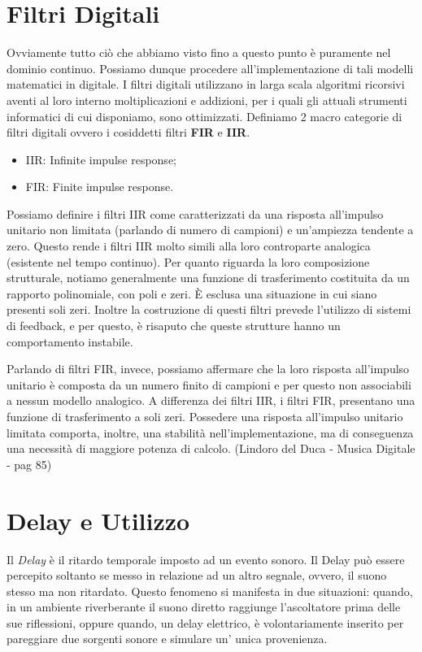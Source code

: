\section{Filtri Digitali}

Ovviamente tutto ciò che abbiamo visto fino a questo punto è puramente nel dominio continuo. Possiamo dunque procedere all’implementazione di tali modelli matematici in digitale. I filtri digitali utilizzano in larga scala algoritmi ricorsivi aventi al loro interno moltiplicazioni e addizioni, per i quali gli attuali strumenti informatici di cui disponiamo, sono ottimizzati. Definiamo 2 macro categorie di filtri digitali ovvero i cosiddetti filtri \textbf{FIR} e \textbf{IIR}.
\begin{itemize}
\item IIR: Infinite impulse response;
\item FIR: Finite impulse response.
\end{itemize}
Possiamo definire i filtri IIR come caratterizzati da una risposta all’impulso unitario non limitata (parlando di numero di campioni) e un’ampiezza tendente a zero.
Questo rende i filtri IIR molto simili alla loro controparte analogica (esistente nel tempo continuo).
Per quanto riguarda la loro composizione strutturale, notiamo generalmente una funzione di trasferimento costituita da un rapporto polinomiale, con poli e zeri. È esclusa una situazione in cui siano presenti soli zeri. Inoltre la costruzione di questi filtri prevede l’utilizzo di sistemi di feedback, e per questo, è risaputo che queste strutture hanno un comportamento instabile.

Parlando di filtri FIR, invece, possiamo affermare che la loro risposta all’impulso unitario è composta da un numero finito di campioni e per questo non associabili a nessun modello analogico.
A differenza dei filtri IIR, i filtri FIR, presentano una funzione di trasferimento a soli zeri.
Possedere una risposta all’impulso unitario limitata comporta, inoltre, una stabilità nell'implementazione, ma di conseguenza una necessità di maggiore potenza di calcolo.
(Lindoro del Duca - Musica Digitale - pag 85)

\section{Delay e Utilizzo}
Il \emph{Delay} è il ritardo temporale imposto ad un evento sonoro. Il Delay può essere percepito soltanto se messo in relazione ad un altro segnale, ovvero, il suono stesso ma non ritardato.
Questo fenomeno si manifesta in due situazioni: quando, in un ambiente riverberante il suono diretto raggiunge l’ascoltatore prima delle sue riflessioni, oppure quando, un delay elettrico, è volontariamente inserito per pareggiare due sorgenti sonore e simulare un’ unica provenienza.

